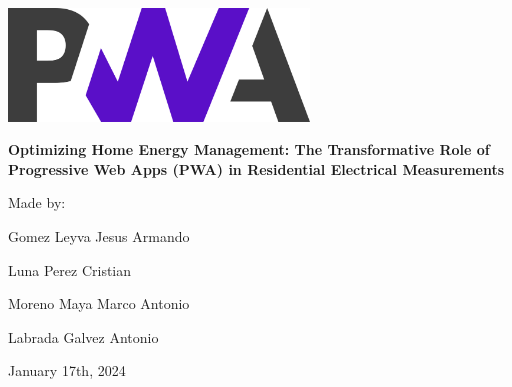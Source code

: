 \documentclass{article}
\begin{document}
\begin{titlepage}
    \centering
    \includegraphics[width=0.6\textwidth]{images/logo.png}
    
    \vspace{2cm}

    {\fontsize{24pt}{28.8pt}\selectfont {}\selectfont \textbf{Optimizing Home Energy Management: The Transformative Role of Progressive Web Apps (PWA) in Residential Electrical Measurements}}
    \vspace{1cm}
    
    {\Large Made by:}

    \vspace{1cm}

    {\fontsize{10pt}{28.8pt}\selectfont Gomez Leyva Jesus Armando}

    \vspace{0.5cm}
    {\fontsize{10pt}{28.8pt}\selectfont Luna Perez Cristian}

    \vspace{0.5cm}
    {\fontsize{10pt}{28.8pt}\selectfont Moreno Maya Marco Antonio}

    \vspace{0.5cm}
    {\fontsize{10pt}{28.8pt}\selectfont Labrada Galvez Antonio}
    
    \vspace{2cm}
    
    {\large January 17th, 2024}
    
\end{titlepage}
\end{document}
